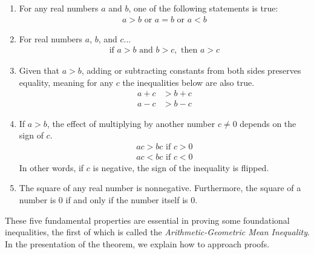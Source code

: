 \documentclass{report}
\begin{document}
\begin{enumerate}
	\item For any real numbers $a$ and $b$, one of the following statements is true:
		\begin{align*}
			a > b \text{ or } a = b \text{ or } a < b
		\end{align*}
	\item For real numbers $a$, $b$, and $c$...
		\begin{align*}
			\text{if } a > b \text{ and } b > c, \text{ then } a > c 
		\end{align*}
	\item Given that $a > b$, adding or subtracting constants from both sides preserves equality, meaning for any $c$ the inequalities below are also true.
		\begin{align*}
			a + c &> b + c \\
			a - c &> b - c
		\end{align*}
	\item If $a > b$, the effect of multiplying by another number $c \neq 0$ depends on the sign of $c$.
		\begin{align*}
			ac > bc \text{ if } c > 0 \\
			ac < bc \text{ if } c < 0
		\end{align*}
		In other words, if $c$ is negative, the sign of the inequality is flipped.
	\item The square of any real number is nonnegative. Furthermore, the square of a number is 0 if and only if the number itself is 0.
\end{enumerate}

These five fundamental properties are essential in proving some foundational inequalities, the first of which is called the \emph{Arithmetic-Geometric Mean Inequality}. In the presentation of the theorem, we explain how to approach proofs. \\
\end{document}
